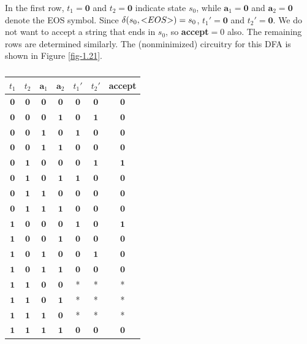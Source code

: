 In the first row, $t_1=\pmb{0}$ and $t_2=\pmb{0}$ indicate state $s_0$, while
$\pmb{a}_1=\pmb{0}$ and $\pmb{a}_2=\pmb{0}$ denote the \<EOS\> symbol. Since $\delta(
s_0,\text{\textless}EOS\text{\textgreater}) = s_0$, $t_1'=\pmb{0}$ and $t_2'=\pmb{0}$. We do not want to accept
a string that ends in $s_0$, so \textbf{accept}$ = 0$ also. The remaining rows are
determined similarly. The (nonminimized) circuitry for this DFA is shown in
Figure \ref{fig-1.21}.

\begin{table}\caption{}\label{tbl-1.3}
\begin{center}
\begin{tabular}{cccc|ccc}
$t_1$ & $t_2$ & $\pmb{a}_1$ & $\pmb{a}_2$ & $t_1'$ & $t_2'$ & \textbf{accept} \\
\hline
$\pmb{0}$ & $\pmb{0}$ & $\pmb{0}$ & $\pmb{0}$ & $\pmb{0}$ & $\pmb{0}$ & $\pmb{0}$ \\
$\pmb{0}$ & $\pmb{0}$ & $\pmb{0}$ & $\pmb{1}$ & $\pmb{0}$ & $\pmb{1}$ & $\pmb{0}$ \\
$\pmb{0}$ & $\pmb{0}$ & $\pmb{1}$ & $\pmb{0}$ & $\pmb{1}$ & $\pmb{0}$ & $\pmb{0}$ \\
$\pmb{0}$ & $\pmb{0}$ & $\pmb{1}$ & $\pmb{1}$ & $\pmb{0}$ & $\pmb{0}$ & $\pmb{0}$ \\
$\pmb{0}$ & $\pmb{1}$ & $\pmb{0}$ & $\pmb{0}$ & $\pmb{0}$ & $\pmb{1}$ & $\pmb{1}$ \\
$\pmb{0}$ & $\pmb{1}$ & $\pmb{0}$ & $\pmb{1}$ & $\pmb{1}$ & $\pmb{0}$ & $\pmb{0}$ \\
$\pmb{0}$ & $\pmb{1}$ & $\pmb{1}$ & $\pmb{0}$ & $\pmb{0}$ & $\pmb{0}$ & $\pmb{0}$ \\
$\pmb{0}$ & $\pmb{1}$ & $\pmb{1}$ & $\pmb{1}$ & $\pmb{0}$ & $\pmb{0}$ & $\pmb{0}$ \\
$\pmb{1}$ & $\pmb{0}$ & $\pmb{0}$ & $\pmb{0}$ & $\pmb{1}$ & $\pmb{0}$ & $\pmb{1}$ \\
$\pmb{1}$ & $\pmb{0}$ & $\pmb{0}$ & $\pmb{1}$ & $\pmb{0}$ & $\pmb{0}$ & $\pmb{0}$ \\
$\pmb{1}$ & $\pmb{0}$ & $\pmb{1}$ & $\pmb{0}$ & $\pmb{0}$ & $\pmb{1}$ & $\pmb{0}$ \\
$\pmb{1}$ & $\pmb{0}$ & $\pmb{1}$ & $\pmb{1}$ & $\pmb{0}$ & $\pmb{0}$ & $\pmb{0}$ \\
$\pmb{1}$ & $\pmb{1}$ & $\pmb{0}$ & $\pmb{0}$ & * & * & * \\
$\pmb{1}$ & $\pmb{1}$ & $\pmb{0}$ & $\pmb{1}$ & * & * & * \\
$\pmb{1}$ & $\pmb{1}$ & $\pmb{1}$ & $\pmb{0}$ & * & * & * \\
$\pmb{1}$ & $\pmb{1}$ & $\pmb{1}$ & $\pmb{1}$ & $\pmb{0}$ & $\pmb{0}$ & $\pmb{0}$
\end{tabular}
\end{center}
\end{table}
\


